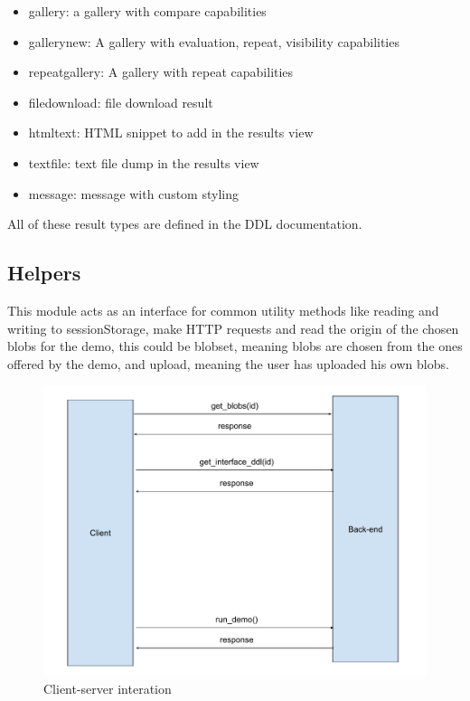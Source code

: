 \begin{itemize}
	\item gallery: a gallery with compare capabilities
	\item gallery\textunderscore new: A gallery with evaluation, repeat, visibility capabilities
	\item repeat\textunderscore gallery: A gallery with repeat capabilities
	\item file\textunderscore download: file download result
	\item html\textunderscore text: HTML snippet to add in the results view
	\item text\textunderscore file: text file dump in the results view
	\item message: message with custom styling
\end{itemize}

All of these result types are defined in the DDL documentation.


\subsection{Helpers}
This module acts as an interface for common utility methods like reading and writing to sessionStorage, make HTTP requests and 
read the origin of the chosen blobs for the demo, this could be blobset, meaning blobs are chosen from the ones offered by the 
demo, and upload, meaning the user has uploaded his own blobs.

\begin{figure}[ht]
	\centering
	\includegraphics[width=\textwidth]{images/client_server_interaction}
	\caption{Client-server interation} 
	\label{fig:server_interaction}
\end{figure}

